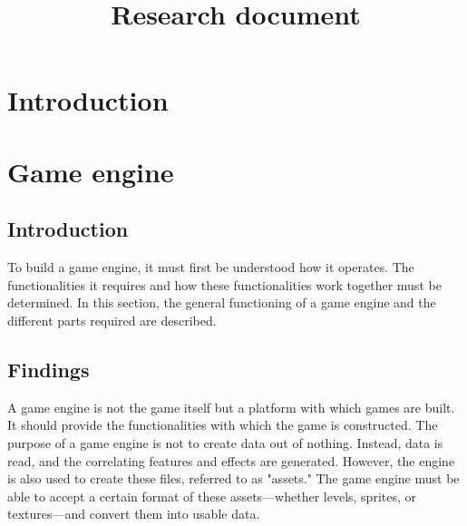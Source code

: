 \documentclass{projdoc}
\title{Research document}
\begin{document}
\tablestables
\section{Introduction}
\section{Game engine}
    \subsection{Introduction}
    To build a game engine, it must first be understood how it operates. 
    The functionalities it requires and how these functionalities work together must be determined.
    In this section, the general functioning of a game engine and the different parts required are described.
    \subsection{Findings}
    A game engine is not the game itself but a platform with which games are built. It should provide the functionalities with which the game is constructed.
    The purpose of a game engine is not to create data out of nothing. Instead, data is read, and the correlating features and effects are generated.
    However, the engine is also used to create these files, referred to as "assets." The game engine must be able to accept a certain format of these assets—whether levels, sprites, or textures—and convert them into usable data.
\end{document}
